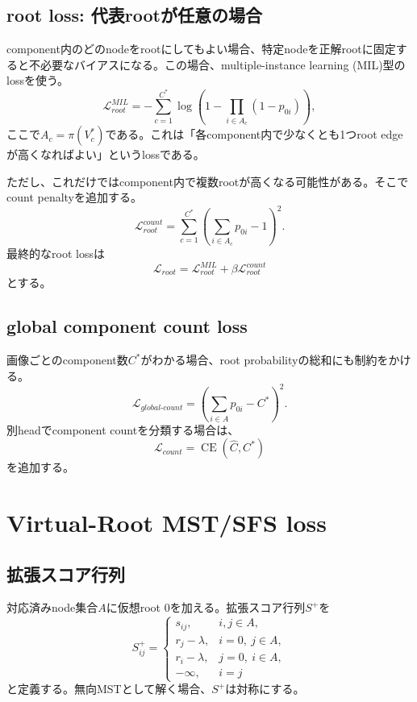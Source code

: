\documentclass[11pt,a4paper]{article}
\begin{document}
\subsection{root loss: 代表rootが任意の場合}
component内のどのnodeをrootにしてもよい場合、特定nodeを正解rootに固定すると不必要なバイアスになる。この場合、multiple-instance learning (MIL)型のlossを使う。
\begin{equation}
  \mathcal{L}_{root}^{MIL}
  =
  -\sum_{c=1}^{C^*}
  \log\left(
    1-\prod_{i\in A_c}(1-p_{0i})
  \right),
  \label{eq:root_mil}
\end{equation}
ここで$A_c=\pi(V_c^*)$である。これは「各component内で少なくとも1つroot edgeが高くなればよい」というlossである。

ただし、これだけではcomponent内で複数rootが高くなる可能性がある。そこでcount penaltyを追加する。
\begin{equation}
  \mathcal{L}_{root}^{count}
  =
  \sum_{c=1}^{C^*}
  \left(\sum_{i\in A_c}p_{0i}-1\right)^2.
  \label{eq:root_count_per_component}
\end{equation}
最終的なroot lossは
\begin{equation}
  \mathcal{L}_{root}
  =
  \mathcal{L}_{root}^{MIL}
  +\beta\mathcal{L}_{root}^{count}
\end{equation}
とする。

\subsection{global component count loss}
画像ごとのcomponent数$C^*$がわかる場合、root probabilityの総和にも制約をかける。
\begin{equation}
  \mathcal{L}_{global\text{-}count}
  =
  \left(\sum_{i\in A}p_{0i}-C^*\right)^2.
\end{equation}
別headでcomponent countを分類する場合は、
\begin{equation}
  \mathcal{L}_{count}=\operatorname{CE}(\hat{C},C^*)
\end{equation}
を追加する。

\section{Virtual-Root MST/SFS loss}
\subsection{拡張スコア行列}
対応済みnode集合$A$に仮想root $0$を加える。拡張スコア行列$S^+$を
\begin{equation}
  S^+_{ij}=\begin{cases}
    s_{ij}, & i,j\in A,
    \\
    r_j-\lambda, & i=0,\ j\in A,
    \\
    r_i-\lambda, & j=0,\ i\in A,
    \\
    -\infty, & i=j
  \end{cases}
\end{equation}
と定義する。無向MSTとして解く場合、$S^+$は対称にする。
\end{document}
